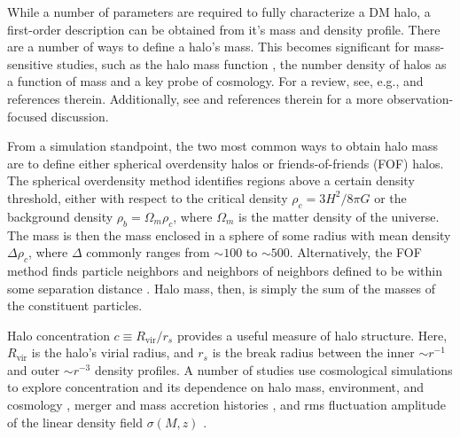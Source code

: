





While a number of parameters are required to fully characterize a DM halo, a first-order description can be obtained from it's mass and density profile.  There are a number of ways to define a halo's mass.  This becomes significant for mass-sensitive studies, such as the halo mass function \citep{1974ApJ...187..425P, 2007MNRAS.374....2R, 2006ApJ...642L..85H, 2007ApJ...671.1160L}, the number density of halos as a function of mass and a key probe of cosmology.  For a review, see, e.g., \citet{2001A&A...367...27W} and references therein.  Additionally, see \citet{2005RvMP...77..207V} and references therein for a more observation-focused discussion.

From a simulation standpoint, the two most common ways to obtain halo mass are to define either spherical overdensity halos or friends-of-friends (FOF) halos.  The spherical overdensity method identifies regions above a certain density threshold, either with respect to the critical density $\rho_{c} = 3 H^{2} / 8 \pi G$ or the background density $\rho_{b} = \Omega_{m} \rho_{c}$, where $\Omega_{m}$ is the matter density of the universe.  The mass is then the mass enclosed in a sphere of some radius with mean density $\Delta \rho_{c}$, where $\Delta$ commonly ranges from $\sim 100$ to $\sim 500$.  Alternatively, the FOF method finds particle neighbors and neighbors of neighbors defined to be within some separation distance \citep{1984MNRAS.206..529E, 1985ApJ...292..371D}.  Halo mass, then, is simply the sum of the masses of the constituent particles.

Halo concentration $c \equiv R_{\mathrm{vir}} / r_{s}$ provides a useful measure of halo structure.  Here, $R_{\mathrm{vir}}$ is the halo's virial radius, and $r_{s}$ is the break radius between the inner $\sim r^{-1}$ and outer $\sim r^{-3}$ density profiles.  A number of studies use cosmological simulations to explore concentration and its dependence on halo mass, environment, and cosmology \citep{1997ApJ...490..493N, 2001MNRAS.321..559B, 2001ApJ...554..114E, 2007MNRAS.381.1450N, 2008MNRAS.387..536G, 2008MNRAS.391.1940M, 2011MNRAS.411..584M, 2011ApJ...740..102K}, merger and mass accretion histories \citep{2002ApJ...568...52W, 2003MNRAS.339...12Z, 2009ApJ...707..354Z}, and rms fluctuation amplitude of the linear density field $\sigma(M, z)$ \citep{2012MNRAS.423.3018P}.




